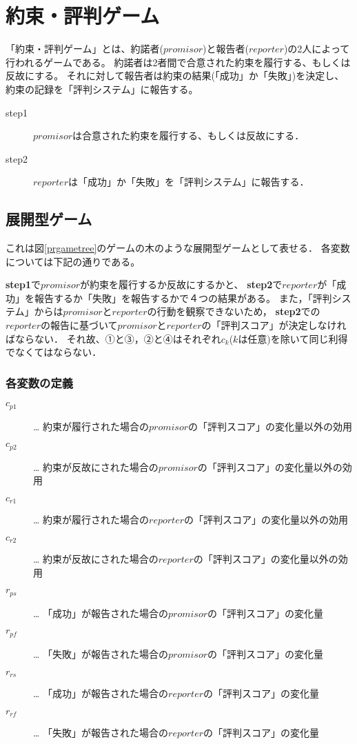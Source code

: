 \section{約束・評判ゲーム}
\label{promiseReputationGame}
「約束・評判ゲーム」とは、約諾者($promisor$)と報告者($reporter$)の2人によって行われるゲームである。
約諾者は2者間で合意された約束を履行する、もしくは反故にする。
それに対して報告者は約束の結果(「成功」か「失敗」)を決定し、約束の記録を「評判システム」に報告する。

\begin{description}
  \item[step1]  $promisor$は合意された約束を履行する、もしくは反故にする．
  \item[step2]  $reporter$は「成功」か「失敗」を「評判システム」に報告する．
\end{description}


\subsection{展開型ゲーム}
\label{prgame-by-extensive-form}

これは図\ref{prgametree}のゲームの木のような展開型ゲームとして表せる．
各変数については下記の通りである。

\textbf{step1}で$promisor$が約束を履行するか反故にするかと、
\textbf{step2}で$reporter$が「成功」を報告するか「失敗」を報告するかで４つの結果がある。
また，「評判システム」からは$promisor$と$reporter$の行動を観察できないため，
\textbf{step2}での$reporter$の報告に基づいて$promisor$と$reporter$の「評判スコア」が決定しなければならない．
それ故、①と③，②と④はそれぞれ$c_k$($k$は任意)を除いて同じ利得でなくてはならない．

\subsubsection{各変数の定義}
\label{prgamePayoffVariables}
\begin{description}
  \item[$c_{p1}$]… 約束が履行された場合の$promisor$の「評判スコア」の変化量以外の効用
  \item[$c_{p2}$]… 約束が反故にされた場合の$promisor$の「評判スコア」の変化量以外の効用
  \item[$c_{r1}$]… 約束が履行された場合の$reporter$の「評判スコア」の変化量以外の効用
  \item[$c_{r2}$]… 約束が反故にされた場合の$reporter$の「評判スコア」の変化量以外の効用
  \item[$r_{ps}$]… 「成功」が報告された場合の$promisor$の「評判スコア」の変化量
  \item[$r_{pf}$]… 「失敗」が報告された場合の$promisor$の「評判スコア」の変化量
  \item[$r_{rs}$]… 「成功」が報告された場合の$reporter$の「評判スコア」の変化量
  \item[$r_{rf}$]… 「失敗」が報告された場合の$reporter$の「評判スコア」の変化量
\end{description}


